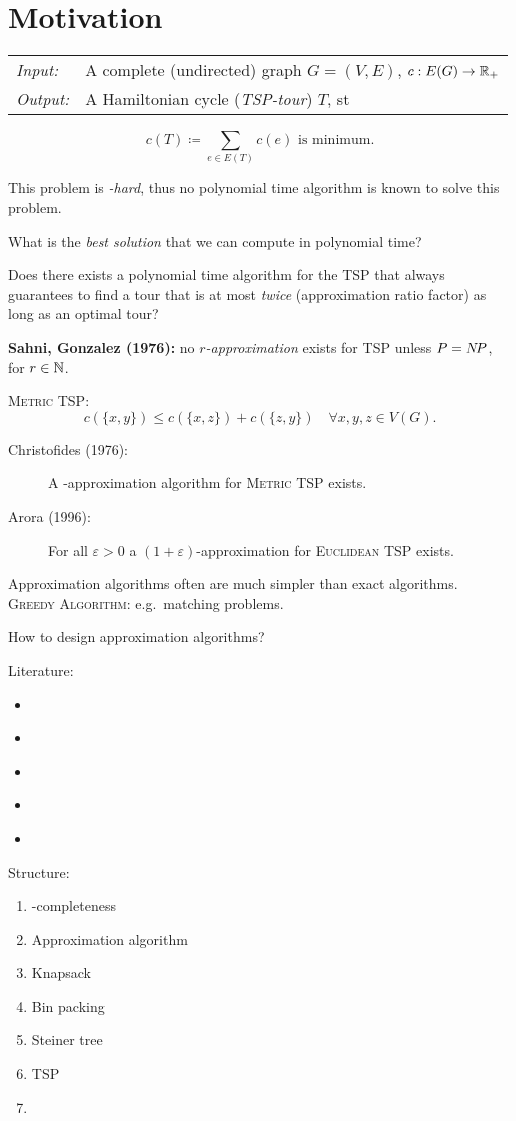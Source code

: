 \documentclass[../skript.tex]{subfiles}
\begin{document}
\addtocounter{chapter}{-1}
\chapter{Motivation}
\begin{problem}
\vspace{\topskip}
\begin{tabular}{ll}
\textit{Input:} & A complete (undirected) graph $G = (V, E)$, $c : E(G) \to \mathbb{R}_+$ \\
\textit{Output:} & A Hamiltonian cycle (\emph{TSP-tour}) $T$, \ac{st}
\end{tabular}
\[
	c(T) \coloneqq \sum_{e \in E(T)} c(e) \text{ is minimum.}
\]
\end{problem}
This problem is \emph{\NP-hard}, thus no polynomial time algorithm is known to solve this problem.

What is the \textit{best solution} that we can compute in polynomial time?

Does there exists a polynomial time algorithm for the \textsc{TSP} that always guarantees to find a tour that is at most \textit{twice} (approximation ratio factor) as long as an optimal tour?

\textbf{Sahni, Gonzalez (1976):} no \emph{$r$-approximation} exists for \textsc{TSP} unless $P = N \! P$, for $r \in \mathbb{N}$.

\textsc{Metric TSP}:
\[
	c(\{x, y\}) \leq c(\{ x, z \}) + c(\{z, y\}) \quad \forall x, y, z \in V(G).
\]
\begin{description}
\item[Christofides (1976):] A -approximation algorithm for \textsc{Metric TSP} exists.
\item[Arora (1996):] For all $\varepsilon > 0$ a $(1 + \varepsilon)$-approximation for \textsc{Euclidean TSP} exists.
\end{description}

Approximation algorithms often are much simpler than exact algorithms. \\
\textsc{Greedy Algorithm}: e.g.~matching problems.

How to design approximation algorithms?

Literature: 
\begin{itemize}
\item \cite[Chapters 15-18, 20, 21]{KorteVygen}
\item \cite{CormenLeiserson}
\item \cite{GareyJohnson}
\item \cite{Vazirani}
\item \cite{JansenMargraf}
\end{itemize}
Structure:
\begin{enumerate}
\item \NP-completeness
\item Approximation algorithm
\item Knapsack
\item Bin packing
\item Steiner tree
\item \textsc{TSP}
\item \PCP
\end{enumerate}
\end{document}
